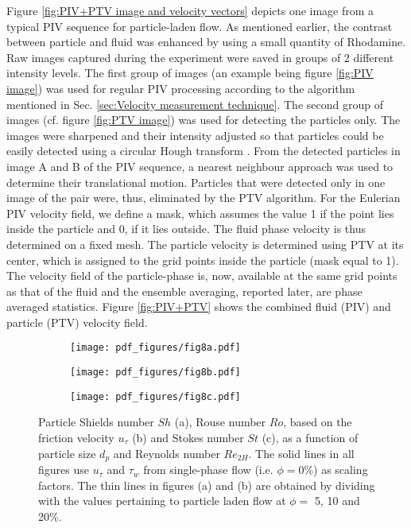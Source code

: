 \documentclass{jfm}
\begin{document}
Figure \ref{fig:PIV+PTV image and velocity vectors} depicts one image from a typical PIV sequence for particle-laden flow. As mentioned earlier, the contrast between particle and fluid was enhanced by using a small quantity of Rhodamine.
Raw images captured during the experiment were saved in groups of 2 different intensity levels. The first group of images (an example being figure \ref{fig:PIV image}) was used for regular PIV processing according to the algorithm mentioned in Sec. \ref{sec:Velocity measurement technique}. The second group of images (cf. figure \ref{fig:PTV image}) was used for detecting the particles only. The images were sharpened and their intensity adjusted so that particles could be easily detected using a circular Hough transform \citep{yuen1990comparative}. From the detected particles in image A and B of the PIV sequence, a nearest neighbour approach was used to determine their translational motion. Particles that were detected only in one image of the pair were, thus, eliminated by the PTV algorithm. 
For the Eulerian PIV velocity field, we define a mask, which assumes the value 1 if the point lies inside the particle and 0, if it lies outside. 
The fluid phase velocity is thus determined on a fixed mesh.
The particle velocity is determined using PTV at its center, which is assigned to the grid points inside the particle (mask equal to 1). 
The velocity field of the particle-phase is, now, available at the same grid points as that of the fluid and the ensemble averaging, reported later, are phase averaged statistics. Figure \ref{fig:PIV+PTV} shows the combined fluid (PIV) and particle (PTV) velocity field.



\begin{figure}
\centering

\begin{subfigure}{.3\textwidth}
  \centering
  \texttt{[image: pdf\_figures/fig8a.pdf]}
  \caption{}
  \label{fig:Shields number}
\end{subfigure}
\begin{subfigure}{.3\textwidth}
  \centering
  \texttt{[image: pdf\_figures/fig8b.pdf]}
  \caption{}
  \label{fig:Rouse number}
\end{subfigure}%
\begin{subfigure}{.3\textwidth}
  \centering
  \texttt{[image: pdf\_figures/fig8c.pdf]}
  \caption{}
  \label{fig:Stokes number}
\end{subfigure}

\caption{Particle Shields number $Sh$ (a), Rouse number $Ro$, based on the friction velocity $u_{\tau}$ (b) and Stokes number $St$ (c), as a function of particle size $d_p$ and Reynolds number $Re_{2H}$. The solid lines in all figures use $u_{\tau}$ and $\tau_{w}$ from single-phase flow (i.e. $\phi=$0\%) as scaling factors. The thin lines in figures (a) and (b) are obtained by dividing with the values pertaining to particle laden flow at $\phi=$ 5, 10 and 20\%.}
\label{fig:Ro_Sh_St}
\end{figure}
\end{document}
